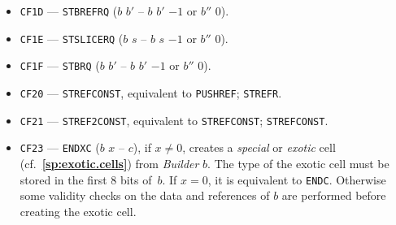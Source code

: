 \documentclass[12pt,oneside]{article}
\def\refpoint#1{{\rm\textbf{\ref{#1}}}}
\let\ptref=\refpoint
\begin{document}
\begin{itemize}
\item {\tt CF1D} --- {\tt STBREFRQ} ($b$ $b'$ -- $b$ $b'$ $-1$ or $b''$ $0$).
\item {\tt CF1E} --- {\tt STSLICERQ} ($b$ $s$ -- $b$ $s$ $-1$ or $b''$ $0$).
\item {\tt CF1F} --- {\tt STBRQ} ($b$ $b'$ -- $b$ $b'$ $-1$ or $b''$ $0$).
\item {\tt CF20} --- {\tt STREFCONST}, equivalent to {\tt PUSHREF}; {\tt STREFR}.
\item {\tt CF21} --- {\tt STREF2CONST}, equivalent to {\tt STREFCONST}; {\tt STREFCONST}.
\item {\tt CF23} --- {\tt ENDXC} ($b$ $x$ -- $c$), if $x\neq0$, creates a {\em special\/} or {\em exotic\/} cell (cf.~\ptref{sp:exotic.cells}) from {\em Builder\/} $b$. The type of the exotic cell must be stored in the first 8 bits of~$b$. If $x=0$, it is equivalent to {\tt ENDC}. Otherwise some validity checks on the data and references of $b$ are performed before creating the exotic cell.


\end{itemize}
\end{document}
